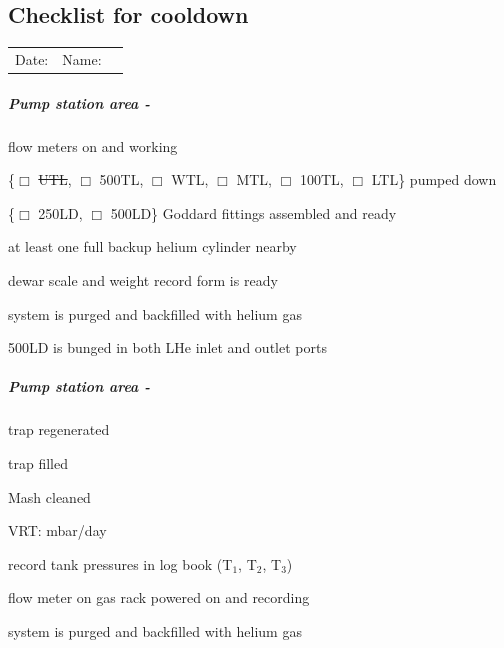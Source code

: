 \begin{appendices}
\noappendicestocpagenum
\addappheadtotoc
\chapter{Checklist for cooldown}
\label{appendix:checklist-for-cooldown}


\begin{tabular}{ l r c }
  Date: \underline{\hspace{4cm}} & Name: \underline{\hspace{4cm}}
\end{tabular}

\paragraph{Pump station area - \hef}

\begin{checklist}
 \item flow meters on and working
 \item \{$\Box$ \sout{UTL}, $\Box$ 500TL, $\Box$ WTL, $\Box$ MTL, $\Box$ 100TL, $\Box$ LTL\} pumped down
 \item \{$\Box$ 250LD, $\Box$ 500LD\} Goddard fittings assembled and ready
 \item at least one full backup helium cylinder nearby
 \item dewar scale and weight record form is ready
 \item system is purged and backfilled with helium gas
 \item 500LD is bunged in both LHe inlet and outlet ports
 
\end{checklist}

\paragraph{Pump station area - \het}
\begin{checklist}
 \item \lnn{} trap regenerated
 \item \lnn{} trap filled
 \item Mash cleaned
 \item \het{} VRT: \makebox[1cm]{\hrulefill} mbar/day
 \item record \het{} tank pressures in log book (T$_1$, T$_2$, T$_3$)
 \item flow meter on \het{} gas rack powered on and recording
 \item system is purged and backfilled with helium gas 
\end{checklist}


\end{appendices}
